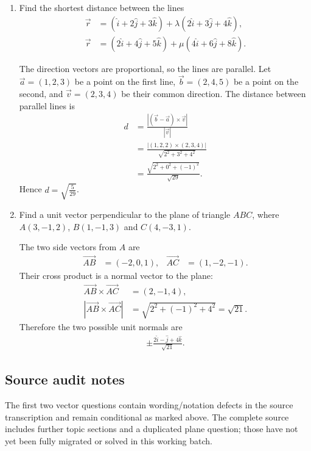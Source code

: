 \begin{enumerate}[label=\thesubsection.\arabic*,ref=\thesubsection.\theenumi]
\item Find the shortest distance between the lines
\begin{align*}
 \vec r&=(\hat i+2\hat j+3\hat k)+\lambda(2\hat i+3\hat j+4\hat k),\\
 \vec r&=(2\hat i+4\hat j+5\hat k)+\mu(4\hat i+6\hat j+8\hat k).
\end{align*}

\solution
The direction vectors are proportional, so the lines are parallel. Let $\vec a=(1,2,3)$ be a point on the first line, $\vec b=(2,4,5)$ be a point on the second, and $\vec v=(2,3,4)$ be their common direction. The distance between parallel lines is
\begin{align}
 d&=\frac{|(\vec b-\vec a)\times\vec v|}{|\vec v|}\\
 &=\frac{|(1,2,2)\times(2,3,4)|}{\sqrt{2^2+3^2+4^2}}\\
 &=\frac{\sqrt{2^2+0^2+(-1)^2}}{\sqrt{29}}.
\end{align}
Hence $\boxed{d=\sqrt{\frac{5}{29}}}$.

\item Find a unit vector perpendicular to the plane of triangle $ABC$, where $A(3,-1,2)$, $B(1,-1,3)$ and $C(4,-3,1)$.

\solution
The two side vectors from $A$ are
\begin{align}
 \overrightarrow{AB}&=(-2,0,1),&\overrightarrow{AC}&=(1,-2,-1).
\end{align}
Their cross product is a normal vector to the plane:
\begin{align}
 \overrightarrow{AB}\times\overrightarrow{AC}&=(2,-1,4),\\
 |\overrightarrow{AB}\times\overrightarrow{AC}|&=\sqrt{2^2+(-1)^2+4^2}=\sqrt{21}.
\end{align}
Therefore the two possible unit normals are
\begin{align}
 \boxed{\pm\frac{2\hat i-\hat j+4\hat k}{\sqrt{21}}}.
\end{align}
\end{enumerate}

\subsection{Source audit notes}
The first two vector questions contain wording/notation defects in the source transcription and remain conditional as marked above. The complete source includes further topic sections and a duplicated plane question; those have not yet been fully migrated or solved in this working batch.
